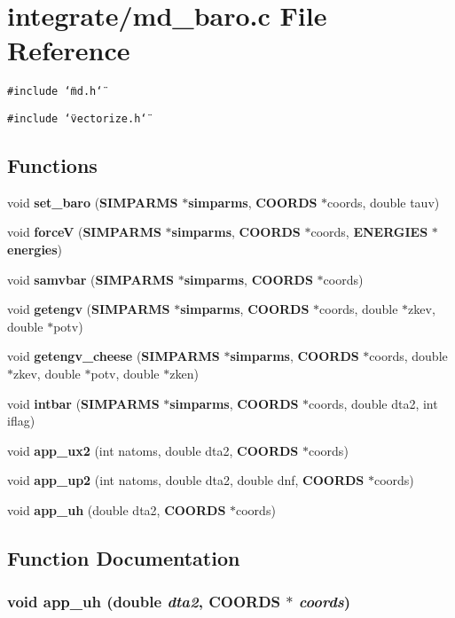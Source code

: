 \section{integrate/md\_\-baro.c File Reference}
\label{integrate_2md__baro_8c}
{\tt \#include \char`\"{}md.h\char`\"{}}\par
{\tt \#include \char`\"{}vectorize.h\char`\"{}}\par
\subsection*{Functions}
\begin{CompactItemize}
\item 
void {\bf set\_\-baro} ({\bf SIMPARMS} $\ast${\bf simparms}, {\bf COORDS} $\ast$coords, double tauv)
\item 
void {\bf force\-V} ({\bf SIMPARMS} $\ast${\bf simparms}, {\bf COORDS} $\ast$coords, {\bf ENERGIES} $\ast${\bf energies})
\item 
void {\bf samvbar} ({\bf SIMPARMS} $\ast${\bf simparms}, {\bf COORDS} $\ast$coords)
\item 
void {\bf getengv} ({\bf SIMPARMS} $\ast${\bf simparms}, {\bf COORDS} $\ast$coords, double $\ast$zkev, double $\ast$potv)
\item 
void {\bf getengv\_\-cheese} ({\bf SIMPARMS} $\ast${\bf simparms}, {\bf COORDS} $\ast$coords, double $\ast$zkev, double $\ast$potv, double $\ast$zken)
\item 
void {\bf intbar} ({\bf SIMPARMS} $\ast${\bf simparms}, {\bf COORDS} $\ast$coords, double dta2, int iflag)
\item 
void {\bf app\_\-ux2} (int natoms, double dta2, {\bf COORDS} $\ast$coords)
\item 
void {\bf app\_\-up2} (int natoms, double dta2, double dnf, {\bf COORDS} $\ast$coords)
\item 
void {\bf app\_\-uh} (double dta2, {\bf COORDS} $\ast$coords)
\end{CompactItemize}


\subsection{Function Documentation}
\subsubsection{\setlength{\rightskip}{0pt plus 5cm}void app\_\-uh (double {\em dta2}, {\bf COORDS} $\ast$ {\em coords})}\label{integrate_2md__baro_8c_db5bb2d6c57d2e3aa807d1c0e6114759}


